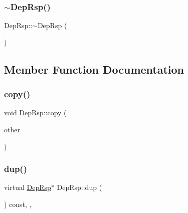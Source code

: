 \mbox{\label{classDepRsp_aa4c1e70c5fd15e5a9541b58999df3480}} 
\subsubsection{\texorpdfstring{$\sim$\+Dep\+Rsp()}{~DepRsp()}}
{\footnotesize\ttfamily Dep\+Rsp\+::$\sim$\+Dep\+Rsp (\begin{DoxyParamCaption}{ }\end{DoxyParamCaption})\hspace{0.3cm}{\ttfamily [virtual]}}



\subsection{Member Function Documentation}
\mbox{\label{classDepRsp_ad8bf8a80dd4586392e1f5179b7b612f5}} 
\subsubsection{\texorpdfstring{copy()}{copy()}}
{\footnotesize\ttfamily void Dep\+Rsp\+::copy (\begin{DoxyParamCaption}\item[{const \hyperlink{classDepRsp}{Dep\+Rsp} \&}]{other }\end{DoxyParamCaption})\hspace{0.3cm}{\ttfamily [private]}}

\mbox{\label{classDepRsp_af70e467ce29aac0e865ac06c3a021019}} 
\subsubsection{\texorpdfstring{dup()}{dup()}}
{\footnotesize\ttfamily virtual \hyperlink{classDepRsp}{Dep\+Rsp}$\ast$ Dep\+Rsp\+::dup (\begin{DoxyParamCaption}{ }\end{DoxyParamCaption}) const\hspace{0.3cm}{\ttfamily [inline]}, {\ttfamily [override]}, {\ttfamily [virtual]}}

